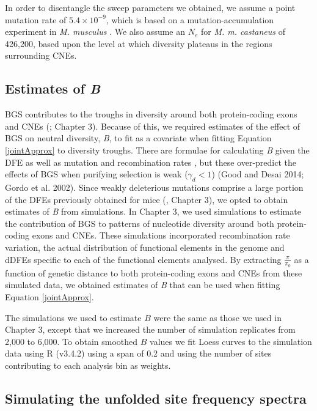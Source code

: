 \documentclass[11pt]{article}
\begin{document}
	In order to disentangle the sweep parameters we obtained, we assume a point mutation rate of $5.4 \times 10^{-9}$, which is based on a mutation-accumulation experiment in \textit{M. musculus} \citep{RN228}.	We also assume an $N_e$ for \textit{M. m. castaneus} of 426,200, based upon the level at which diversity plateaus in the regions surrounding CNEs.

	\subsection*{Estimates of \textit{B}} 
 
 	BGS contributes to the troughs in diversity around both protein-coding exons and CNEs (\citealt{RN122}; Chapter 3). Because of this, we required estimates of the effect of BGS on neutral diversity, \textit{B}, to fit as a covariate when fitting Equation \ref{jointApprox} to diversity troughs. There are formulae for calculating \textit{B} given the DFE as well as mutation and recombination rates \citep{RN157, RN206}, but these over-predict the effects of BGS when purifying selection is weak ($\gamma_d < 1$) (Good and Desai 2014; Gordo et al. 2002). Since weakly deleterious mutations comprise a large portion of the DFEs previously obtained for mice (\citealt{RN122}, Chapter 3), we opted to obtain estimates of \textit{B} from simulations. In Chapter 3, we used simulations to estimate the contribution of BGS to patterns of nucleotide diversity around both protein-coding exons and CNEs. These simulations incorporated recombination rate variation, the actual distribution of functional elements in the genome and dDFEs specific to each of the functional elements analysed. By extracting $\frac{\pi}{\pi_0}$ as a function of genetic distance to both protein-coding exons and CNEs from these simulated data, we obtained estimates of \textit{B} that can be used when fitting Equation \ref{jointApprox}.
 	
 	The simulations we used to estimate $B$ were the same as those we used in Chapter 3, except that we increased the number of simulation replicates from 2,000 to 6,000. To obtain smoothed $B$ values we fit Loess curves to the simulation data using R (v3.4.2) using a span of 0.2 and using the number of sites contributing to each analysis bin as weights.

	\subsection*{Simulating the unfolded site frequency spectra}
	
\end{document}

